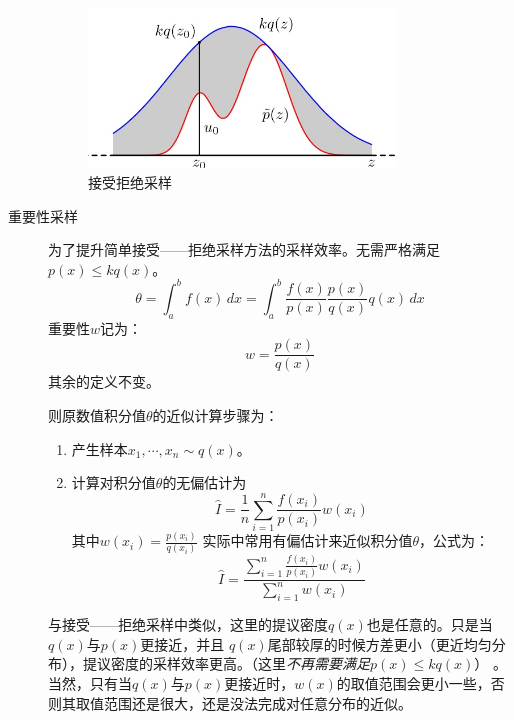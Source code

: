 \documentclass{ctexart}
\begin{document}
\begin{description}
\begin{figure}[H]
\begin{center}
\includegraphics[width=0.8\textwidth]{fig/kq(x)--x.jpg} %
\caption{接受拒绝采样}
\end{center}
\end{figure}

\item[重要性采样]
为了提升简单接受——拒绝采样方法的采样效率。无需严格满足$p\left(x\right)\le kq\left(x\right)$。
\begin{equation}
\theta = \int_{a}^{b}f\left(x\right)\,dx=\int_{a}^{b}\frac{f\left(x\right)}{p\left(x\right)}\frac{p\left(x\right)} {q\left(x\right)}q\left(x\right)  \,dx
\end{equation}
重要性$w$记为：
\begin{equation}
w=\frac{p\left(x\right)} {q\left(x\right)}
\end{equation}
其余的定义不变。


则原数值积分值$\theta$的近似计算步骤为：
\begin{enumerate}[-]
\item
产生样本$x_1,\cdots, x_n \sim q\left(x\right)$。

\item
计算对积分值$\theta$的无偏估计为
\begin{equation}
\hat{I}=\frac{1}{n}\sum\limits_{i=1}^{n}\frac{f\left(x_i\right)}{p\left(x_i\right)}w\left(x_i\right)
\end{equation}
其中$w\left(x_i\right)=\frac{p\left(x_i\right)} {q\left(x_i\right)}$
实际中常用有偏估计来近似积分值$\theta$，公式为：
\begin{equation}
\hat{I}=\frac{\sum\limits_{i=1}^{n}\frac{f\left(x_i\right)}{p\left(x_i\right)}w\left(x_i\right)}{\sum\limits_{i=1}^{n}w\left(x_i\right)}
\end{equation}
\end{enumerate}
与接受——拒绝采样中类似，这里的提议密度$q\left(x\right)$也是任意的。只是当$q\left(x\right)$与$p\left(x\right)$更接近，并且 $q\left(x\right)$尾部较厚的时候方差更小（更近均匀分布），提议密度的采样效率更高。（这里\emph{不再需要满足}$p\left(x\right)\le kq\left(x\right)$） 。
当然，只有当$q\left(x\right)$与$p\left(x\right)$更接近时，$w\left(x\right)$的取值范围会更小一些，否则其取值范围还是很大，还是没法完成对任意分布的近似。



\end{description}
\end{document}
